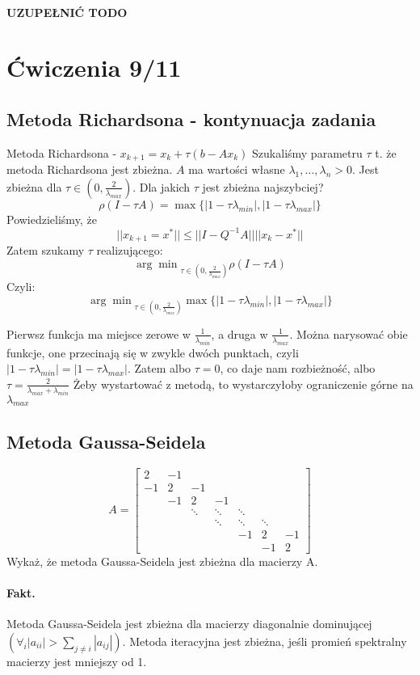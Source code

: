 \documentclass{article}
\begin{document}
\paragraph{UZUPEŁNIĆ TODO}
\section{Ćwiczenia 9/11}
\subsection{Metoda Richardsona - kontynuacja zadania}
Metoda Richardsona - $ x_{k+1}=x_k+\tau(b-Ax_k) $
Szukaliśmy parametru $ \tau $ t. że metoda Richardsona jest zbieżna.
$ A $ ma wartości własne $ \lambda_1, \ldots, \lambda_n>0 $.
Jest zbieżna dla $ \tau\in(0, \frac2{\lambda_{max}}) $. Dla jakich $ \tau $ jest zbieżna najszybciej?
$$\rho(I-\tau A)=\max\{|1-\tau\lambda_{min}|, |1-\tau\lambda_{max}|\}$$
Powiedzieliśmy, że
$$ ||x_{k+1}=x^*||\le||I-Q^{-1}A||||x_k-x^*|| $$
Zatem szukamy $ \tau $ realizującego: 
$$ {\arg\min}_{\tau\in(0, \frac2{\lambda_{max}})}\rho(I-\tau A)$$
Czyli: 
$$ {\arg\min}_{\tau\in(0, \frac2{\lambda_{max}})} \max\{|1-\tau\lambda_{min}|, |1-\tau\lambda_{max}|\} $$

Pierwsz funkcja ma miejsce zerowe w $ \frac1{\lambda_{min}} $, a druga w $ \frac1{\lambda_{max}} $. Można narysować obie funkcje, one przecinają się w zwykle dwóch punktach, czyli $ |1-\tau\lambda_{min}| = |1-\tau\lambda_{max}| $. Zatem albo $ \tau = 0 $, co daje nam rozbieżność, albo $ \tau=\frac2{\lambda_{max}+\lambda_{min}} $ Żeby wystartować z metodą, to wystarczyłoby ograniczenie górne na $ \lambda_{max} $
\subsection{Metoda Gaussa-Seidela}
$$A=\begin{bmatrix}
	2&-1&&&&\\
	-1&2&-1&&&&\\
	&-1&2&-1&&&\\
	&&\ddots&\ddots&\ddots&&\\
	&&&\ddots&\ddots&\ddots&\\
	&&&&-1&2&-1\\
	&&&&&-1&2
\end{bmatrix}$$
Wykaż, że metoda Gaussa-Seidela jest zbieżna dla macierzy A.
\paragraph{Fakt.} Metoda Gaussa-Seidela jest zbieżna dla macierzy diagonalnie dominującej $ (\forall_{i}|a_{ii}|>\sum_{j\not=i}|a_{ij}|) $.
Metoda iteracyjna jest zbieżna, jeśli promień spektralny macierzy jest mniejszy od 1.
\end{document}
